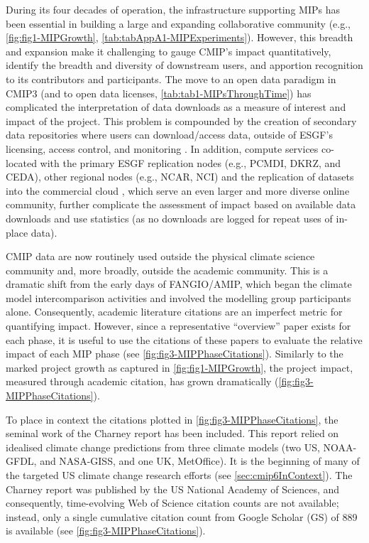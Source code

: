 \documentclass[manuscript]{copernicus}
\begin{document}
During its four decades of operation, the infrastructure supporting MIPs has been essential in building a large and expanding collaborative community (e.g., \autoref{fig:fig1-MIPGrowth}, \autoref{tab:tabAppA1-MIPExperiments}). However, this breadth and expansion make it challenging to gauge CMIP's impact quantitatively, identify the breadth and diversity of downstream users, and apportion recognition to its contributors and participants. The move to an open data paradigm in CMIP3 (and to open data licenses, \autoref{tab:tab1-MIPsThroughTime}) has complicated the interpretation of data downloads as a measure of interest and impact of the project. This problem is compounded by the creation of secondary data repositories where users can download/access data, outside of ESGF's licensing, access control, and monitoring \citep[e.g.,][]{balaji_requirements_2018}. In addition, compute services co-located with the primary ESGF replication nodes (e.g., PCMDI, DKRZ, and CEDA), other regional nodes (e.g., NCAR, NCI) and the replication of datasets into the commercial cloud \citep[e.g., PANGEO;][]{abernathey_cmip6_2020}, which serve an even larger and more diverse online community, further complicate the assessment of impact based on available data downloads and use statistics (as no downloads are logged for repeat uses of in-place data).

CMIP data are now routinely used outside the physical climate science community and, more broadly, outside the academic community. This is a dramatic shift from the early days of FANGIO/AMIP, which began the climate model intercomparison activities and involved the modelling group participants alone. Consequently, academic literature citations are an imperfect metric for quantifying impact. However, since a representative ``overview'' paper exists for each phase, it is useful to use the citations of these papers to evaluate the relative impact of each MIP phase (see \autoref{fig:fig3-MIPPhaseCitations}). Similarly to the marked project growth as captured in \autoref{fig:fig1-MIPGrowth}, the project impact, measured through academic citation, has grown dramatically (\autoref{fig:fig3-MIPPhaseCitations}).

To place in context the citations plotted in \autoref{fig:fig3-MIPPhaseCitations}, the seminal work of the Charney report \citep{charney_carbon_1979} has been included. This report relied on idealised climate change predictions from three climate models (two US, NOAA-GFDL, and NASA-GISS, and one UK, MetOffice). It is the beginning of many of the targeted US climate change research efforts (see \autoref{sec:cmip6InContext}). The Charney report was published by the US National Academy of Sciences, and consequently, time-evolving Web of Science citation counts are not available; instead, only a single cumulative citation count from Google Scholar (GS) of 889 is available (see \autoref{fig:fig3-MIPPhaseCitations}).
\end{document}
